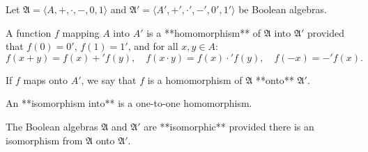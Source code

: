 Let $\mathfrak{A} = \langle A, +, \cdot, -, 0, 1 \rangle$ and $\mathfrak{A}' = \langle A', +', \cdot', -', 0', 1' \rangle$ be Boolean algebras.

A function $f$ mapping $A$ into $A'$ is a **homomorphism** of $\mathfrak{A}$ into $\mathfrak{A}'$ provided that $f(0) = 0'$, $f(1) = 1'$, and for all $x, y \in A$:
$$f(x + y) = f(x) +' f(y), \quad f(x \cdot y) = f(x) \cdot' f(y), \quad f(-x) = -' f(x).$$

If $f$ maps onto $A'$, we say that $f$ is a homomorphism of $\mathfrak{A}$ **onto** $\mathfrak{A}'$.

An **isomorphism into** is a one-to-one homomorphism.

The Boolean algebras $\mathfrak{A}$ and $\mathfrak{A}'$ are **isomorphic** provided there is an isomorphism from $\mathfrak{A}$ onto $\mathfrak{A}'$.
